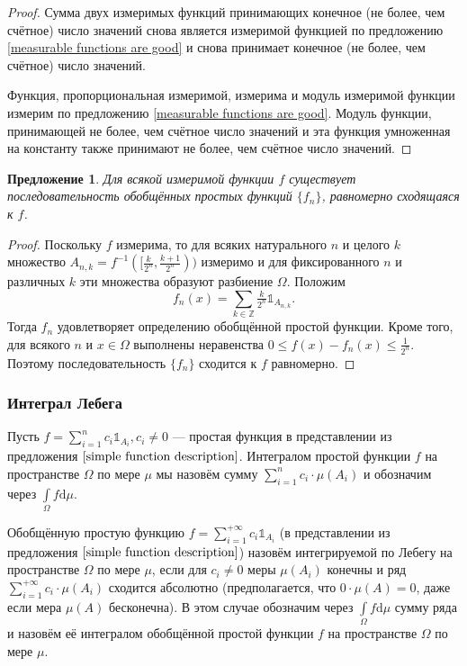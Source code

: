 \documentclass[12pt]{article}
\newtheorem{proposition}[theorem]{Предложение}
\numberwithin{theorem}{section}
\theoremstyle{definition}
\newcommand{\defin}[2]{\hypertarget{#2}{{\color{red} #1}}}
\newcommand{\ind}{\mathds{1}}
\newcommand{\diff}{\mathrm{d}}
\begin{document}
	\begin{proof}
		Сумма двух измеримых функций принимающих конечное (не более, чем счётное) число значений снова является
		измеримой функцией по предложению \ref{measurable functions are good} 
		и снова принимает конечное (не более, чем счётное) число значений.
		
		Функция, пропорциональная измеримой, измерима и модуль измеримой функции измерим по предложению 
		\ref{measurable functions are good}. Модуль функции, принимающей не более, чем счётное число значений
		и эта функция умноженная на константу также принимают не более, чем счётное число значений.
	\end{proof}

	\begin{proposition} \label{uniformly converging to measurable function}
		Для всякой измеримой функции $ f $ существует последовательность обобщённых простых функций $ \{f_n\} $,
		равномерно сходящаяся к $ f $.
	\end{proposition}
	
	\begin{proof}
		Поскольку $ f $ измерима, то для всяких натурального $ n $ и целого $ k $
		множество $ A_{n, k} = f^{-1}([\tfrac{k}{2^n}, \tfrac{k + 1}{2^n})) $ измеримо
		и для фиксированного $ n $ и различных $ k $ эти множества образуют разбиение $ \Omega $.
		Положим 
		$$ f_n(x) = \sum\limits_{k \in \mathbb{Z}} \tfrac{k}{2^n}\ind_{A_{n, k}}. $$
		Тогда $ f_n $ удовлетворяет определению обобщённой простой функции.
		Кроме того, для всякого $ n $ и $ x \in \Omega $ 
		выполнены неравенства $ 0 \leqslant f(x) - f_n(x) \leqslant \tfrac{1}{2^n} $.
		Поэтому последовательность $ \{f_n\} $ сходится к $ f $ равномерно.
	\end{proof}
	
	\subsubsection{Интеграл Лебега}
	
	Пусть $ f = \sum\limits_{i = 1}^{n}c_i\ind_{A_i}, c_i \neq 0 $ --- простая функция в представлении из предложения
	$ \ref{simple function description} $.
	\defin{Интегралом простой функции $ f $ на пространстве $ \Omega $ по мере $ \mu $}{simple-function-integral} 
	мы назовём сумму $ \sum\limits_{i = 1}^{n} c_i\cdot\mu(A_i) $ и обозначим через $ \int\limits_{\Omega} f\diff\mu $.
	
	Обобщённую простую функцию $ f = \sum\limits_{i = 1}^{+\infty}c_i\ind_{A_i} $ (в представлении из предложения
	$ \ref{simple function description} $) назовём 
	\defin{интегрируемой по Лебегу на пространстве $ \Omega $ по мере $ \mu $}{generalized-simple-function-integrability},
	если для $ c_i \neq 0 $ меры $ \mu(A_i) $ конечны и 
	ряд $ \sum\limits_{i = 1}^{+\infty} c_i\cdot\mu(A_i) $ сходится абсолютно (предполагается, что $ 0 \cdot \mu(A) = 0 $, даже если мера $ \mu(A) $ бесконечна).
	В этом случае обозначим через $ \int\limits_{\Omega} f\diff\mu $ сумму ряда и назовём её
	\defin{интегралом обобщённой простой функции $ f $ на пространстве $ \Omega $ по мере $ \mu $}{generalized-simple-function-integral}. 
	
\end{document}
